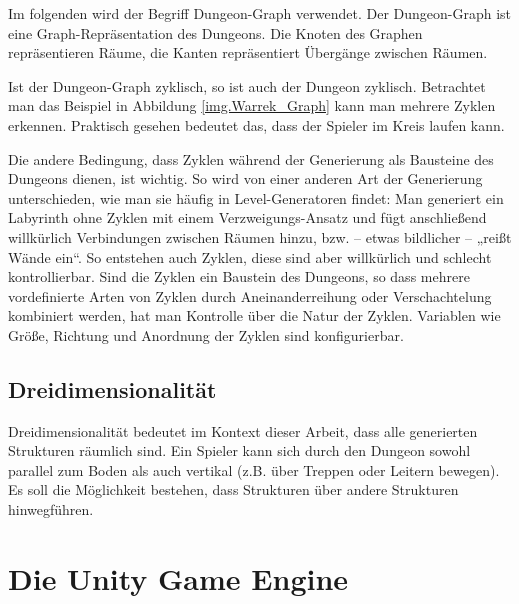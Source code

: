 Im folgenden wird der Begriff Dungeon-Graph verwendet. Der Dungeon-Graph ist eine Graph-Repräsentation des Dungeons. Die Knoten des Graphen repräsentieren Räume, die Kanten repräsentiert Übergänge zwischen Räumen. 


Ist der Dungeon-Graph zyklisch, so ist auch der Dungeon zyklisch. Betrachtet man das Beispiel in Abbildung \ref{img.Warrek_Graph} kann man mehrere Zyklen erkennen. Praktisch gesehen bedeutet das, dass der Spieler im Kreis laufen kann. 

Die andere Bedingung, dass Zyklen während der Generierung als Bausteine des Dungeons dienen, ist wichtig. So wird von einer anderen Art der Generierung unterschieden, wie man sie häufig in Level-Generatoren findet: Man generiert ein Labyrinth ohne Zyklen mit einem Verzweigungs-Ansatz und fügt anschließend willkürlich Verbindungen zwischen Räumen hinzu, bzw. -- etwas bildlicher -- „reißt Wände ein“. So entstehen auch Zyklen, diese sind aber willkürlich und schlecht kontrollierbar. Sind die Zyklen ein Baustein des Dungeons, so dass mehrere vordefinierte Arten von Zyklen durch Aneinanderreihung oder Verschachtelung kombiniert werden, hat man Kontrolle über die Natur der Zyklen. Variablen wie Größe, Richtung und Anordnung der Zyklen sind konfigurierbar.

\subsection{Dreidimensionalität}

Dreidimensionalität bedeutet im Kontext dieser Arbeit, dass alle generierten Strukturen räumlich sind. Ein Spieler kann sich durch den Dungeon sowohl parallel zum Boden als auch vertikal (z.B. über Treppen oder Leitern bewegen). Es soll die Möglichkeit bestehen, dass Strukturen über andere Strukturen hinwegführen.


\section{Die Unity Game Engine}

